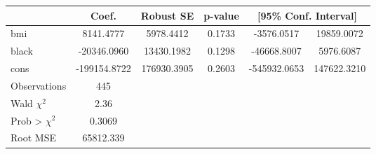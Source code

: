 {
\def\sym#1{\ifmmode^{#1}\else\(^{#1}\)\fi}
\begin{tabular}{l*{1}{ccccc}}
\toprule
            &       Coef.&   Robust SE&     p-value         &\multicolumn{2}{c}{[95\% Conf. Interval]}            \\
\midrule
bmi         &   8141.4777&   5978.4412&      0.1733         &  -3576.0517&  19859.0072\\
black       & -20346.0960&  13430.1982&      0.1298         & -46668.8007&   5976.6087\\
cons        &-199154.8722& 176930.3905&      0.2603         &-545932.0653& 147622.3210\\
\midrule
Observations&         445&            &                     &            &            \\
Wald $\chi^2$     &        2.36&            &                     &            &            \\
Prob > $\chi^2$   &      0.3069&            &                     &            &            \\
Root MSE    &   65812.339&            &                     &            &            \\
\bottomrule
\end{tabular}
}
